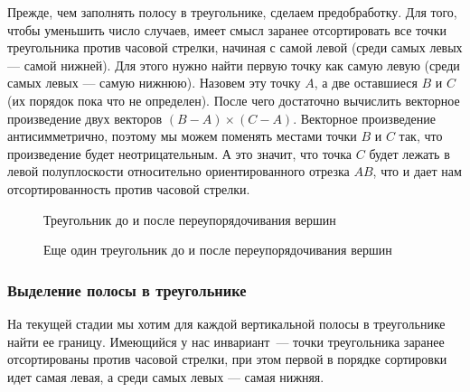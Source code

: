 \documentclass{article}
\begin{document}
Прежде, чем заполнять полосу в треугольнике, сделаем предобработку. Для того, чтобы уменьшить число случаев, имеет смысл заранее отсортировать все точки треугольника против часовой стрелки, начиная с самой левой (среди самых левых --- самой нижней). Для этого нужно найти первую точку как самую левую (среди самых левых --- самую нижнюю). Назовем эту точку $A$, а две оставшиеся $B$ и $C$ (их порядок пока что не определен). После чего достаточно вычислить векторное произведение двух векторов $(B - A) \times (C - A)$. Векторное произведение антисимметрично, поэтому мы можем поменять местами точки $B$ и $C$ так, что произведение будет неотрицательным. А это значит, что точка $C$ будет лежать в левой полуплоскости относительно ориентированного отрезка $AB$, что и дает нам отсортированность против часовой стрелки.

\begin{center}
\begin{figure}[H]
\caption{Треугольник до и после переупорядочивания вершин}
\label{ris:image}
\end{figure}
\begin{figure}[H]
\caption{Еще один треугольник до и после переупорядочивания вершин}
\label{ris:image}
\end{figure}
\end{center}

\subsubsection{Выделение полосы в треугольнике}

На текущей стадии мы хотим для каждой вертикальной полосы в треугольнике найти ее границу. Имеющийся у нас инвариант~--- точки треугольника заранее отсортированы против часовой стрелки, при этом первой в порядке сортировки идет самая левая, а среди самых левых --- самая нижняя.
\end{document}
